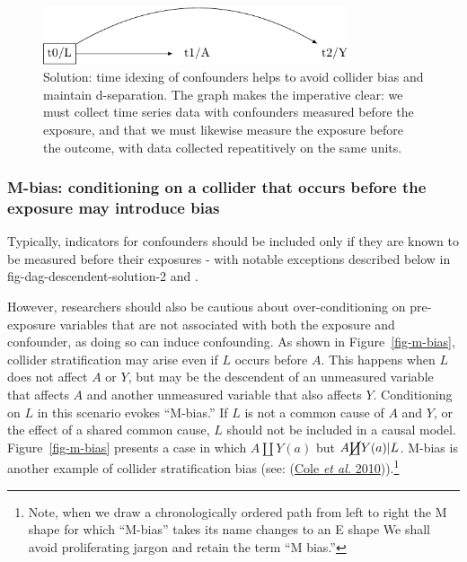 \documentclass[
  singlecolumn]{article}
\begin{document}
\begin{figure}

{\centering \includegraphics[width=0.8\textwidth,height=\textheight]{causal-dags_files/figure-pdf/fig-dag-common-effect-solution-1.pdf}

}

\caption{\label{fig-dag-common-effect-solution}Solution: time idexing of
confounders helps to avoid collider bias and maintain d-separation. The
graph makes the imperative clear: we must collect time series data with
confounders measured before the exposure, and that we must likewise
measure the exposure before the outcome, with data collected
repeatitively on the same units.}

\end{figure}

\hypertarget{m-bias-conditioning-on-a-collider-that-occurs-before-the-exposure-may-introduce-bias}{%
\subsubsection{M-bias: conditioning on a collider that occurs before the
exposure may introduce
bias}\label{m-bias-conditioning-on-a-collider-that-occurs-before-the-exposure-may-introduce-bias}}

Typically, indicators for confounders should be included only if they
are known to be measured before their exposures - with notable
exceptions described below in fig-dag-descendent-solution-2 and .

However, researchers should also be cautious about over-conditioning on
pre-exposure variables that are not associated with both the exposure
and confounder, as doing so can induce confounding. As shown in
Figure~\ref{fig-m-bias}, collider stratification may arise even if \(L\)
occurs before \(A\). This happens when \(L\) does not affect \(A\) or
\(Y\), but may be the descendent of an unmeasured variable that affects
\(A\) and another unmeasured variable that also affects \(Y\).
Conditioning on \(L\) in this scenario evokes ``M-bias.'' If \(L\) is
not a common cause of \(A\) and \(Y\), or the effect of a shared common
cause, \(L\) should not be included in a causal model.
Figure~\ref{fig-m-bias} presents a case in which \(A \coprod Y(a)\) but
\(A \cancel{\coprod} Y(a)| L\). M-bias is another example of collider
stratification bias (see: (\protect\hyperlink{ref-cole2010}{Cole
\emph{et al.} 2010})).\footnote{Note, when we draw a chronologically
  ordered path from left to right the M shape for which ``M-bias'' takes
  its name changes to an E shape We shall avoid proliferating jargon and
  retain the term ``M bias.''}
\end{document}
